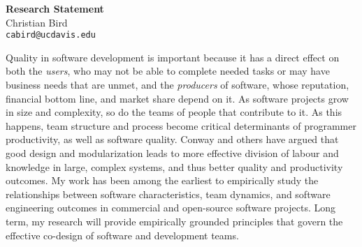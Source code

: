 \documentclass[10pt]{article}
\begin{document}
\thispagestyle{fancy}
\lhead{}
\rhead{}
\renewcommand{\headrulewidth}{0pt} 
\renewcommand{\footrulewidth}{0pt} 


\pagestyle{fancy}

\begin{small}

\begin{center}
{\LARGE \bf Research Statement}\\
\vspace*{0.2cm}
{\large Christian Bird}\\
\vspace*{0cm}
\texttt{\normalsize cabird@ucdavis.edu}
\end{center}



Quality in software development is important because it has
a direct effect on both the \emph{users}, who may not be able
to complete needed tasks or may have business needs that are unmet,
and the \emph{producers} of software, whose reputation, financial
bottom line, and market share depend on it.
As software projects grow in size and complexity, so do the
teams of people that contribute to it.  As this happens, team structure and
process  become critical determinants of programmer productivity, as well as
software quality.  Conway and others have argued that good design and
modularization leads to more effective division of labour and knowledge in
large, complex systems, and thus better quality and productivity outcomes.  My
work has been among the earliest to empirically study the relationships between
software characteristics, team dynamics, and software engineering outcomes in
commercial and open-source software projects.  Long term, my research will
provide empirically grounded  principles that govern the effective co-design of
software and development teams. 



\end{small}
\end{document}
